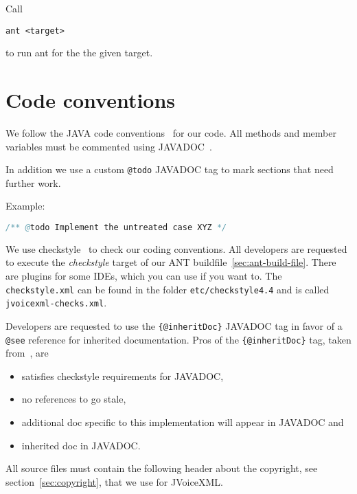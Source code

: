 \documentclass[11pt,a4paper]{article}
\begin{document}
Call
\begin{lstlisting}
ant <target>
\end{lstlisting}
to run ant for the the given target.

\section{Code conventions}
\label{sec:code-conventions}

We follow the JAVA code conventions~\cite{sun:codeconv} for our code. All
methods and member variables must be commented using 
JAVADOC~\cite{sun:javadoc_guidelines}.

In addition we use a custom \texttt{@todo} JAVADOC tag to mark
sections that need further work.

Example:

\begin{lstlisting}[language=Java]
/** @todo Implement the untreated case XYZ */
\end{lstlisting}

We use checkstyle~\cite{checkstyle} to check our coding conventions.
All developers are requested to execute the \emph{checkstyle} target
of our ANT buildfile~\ref{sec:ant-build-file}. 
There are plugins for some IDEs, which you can use if you want to. The
\texttt{checkstyle.xml} can be found in the folder 
\texttt{etc/checkstyle4.4} and is called \texttt{jvoicexml-checks.xml}.

Developers are requested to use the \texttt{\{@inheritDoc\}} JAVADOC
tag in favor of a \texttt{@see} reference for inherited documentation.
Pros of the \texttt{\{@inhe\-rit\-Doc\}} tag, taken 
from~\cite{tauber:inheritdoc}, are
\begin{itemize}
\item satisfies checkstyle requirements for JAVADOC,
\item no references to go stale,
\item additional doc specific to this implementation will appear in JAVADOC and
\item inherited doc in JAVADOC.
\end{itemize}

All source files must contain the following header about the 
copyright, see section~\ref{sec:copyright}, that we use for JVoiceXML.
\end{document}
